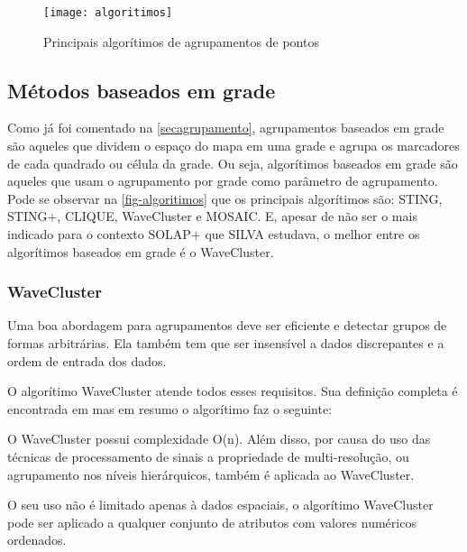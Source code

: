 \begin{figure}[htb]
	\caption{\label{fig-algoritimos}Principais algorítimos de agrupamentos de pontos}
	\begin{center}
	    \texttt{[image: algoritimos]}
	\end{center}
\end{figure}

		\subsection{Métodos baseados em grade}
		Como já foi comentado na \autoref{secagrupamento}, agrupamentos baseados em grade são aqueles que dividem o espaço do mapa em uma grade e agrupa os marcadores de cada quadrado ou célula da grade.  Ou seja, algorítimos baseados em grade são aqueles que usam o agrupamento por grade como parâmetro de agrupamento. 
		Pode se observar na \autoref{fig-algoritimos} que os principais algorítimos são: STING, STING+, CLIQUE, WaveCluster e MOSAIC. E, apesar de não ser o mais indicado para o contexto SOLAP+ que SILVA estudava, o melhor entre os algorítimos baseados em grade é o WaveCluster.
		
		
		\subsubsection{WaveCluster}
			Uma boa abordagem para agrupamentos deve ser eficiente e detectar grupos de formas arbitrárias. Ela também tem que ser insensível a dados discrepantes e a ordem de entrada dos dados.
			
			O algorítimo WaveCluster atende todos esses requisitos. Sua definição completa é encontrada em \cite{wavecluster} mas em resumo o algorítimo faz o seguinte:

O WaveCluster possui complexidade O(n). Além disso, por causa do uso das técnicas de processamento de sinais a propriedade de multi-resolução, ou agrupamento nos níveis hierárquicos, também é aplicada ao WaveCluster.

O seu uso não é limitado apenas à dados espaciais, o algorítimo WaveCluster pode ser aplicado a qualquer conjunto de atributos com valores numéricos ordenados.

